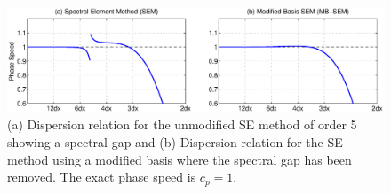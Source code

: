 \documentclass[11pt]{article}
\begin{document}

\begin{figure}
\begin{center}
\includegraphics[width=6.5in]{ModifiedBasisMethod}
\end{center}
\caption{(a) Dispersion relation for the unmodified SE method of order 5 showing a spectral gap and (b) Dispersion relation for the SE method using a modified basis where the spectral gap has been removed.  The exact phase speed is $c_p = 1$.} \label{fig:SEMDispersionGap}
\end{figure}
\end{document}
